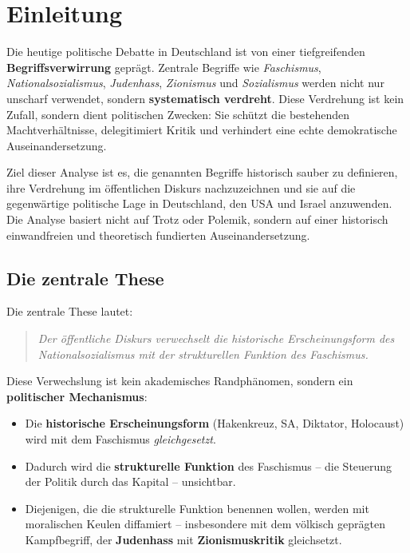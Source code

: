 \section{Einleitung}

Die heutige politische Debatte in Deutschland ist von einer tiefgreifenden \textbf{Begriffsverwirrung} geprägt. Zentrale Begriffe wie \emph{Faschismus}, \emph{Nationalsozialismus}, \emph{Judenhass}, \emph{Zionismus} und \emph{Sozialismus} werden nicht nur unscharf verwendet, sondern \textbf{systematisch verdreht}. Diese Verdrehung ist kein Zufall, sondern dient politischen Zwecken: Sie schützt die bestehenden Machtverhältnisse, delegitimiert Kritik und verhindert eine echte demokratische Auseinandersetzung.

Ziel dieser Analyse ist es, die genannten Begriffe historisch sauber zu definieren, ihre Verdrehung im öffentlichen Diskurs nachzuzeichnen und sie auf die gegenwärtige politische Lage in Deutschland, den USA und Israel anzuwenden. Die Analyse basiert nicht auf Trotz oder Polemik, sondern auf einer historisch einwandfreien und theoretisch fundierten Auseinandersetzung.

\subsection{Die zentrale These}

Die zentrale These lautet:

\begin{quote}
\emph{Der öffentliche Diskurs verwechselt die historische Erscheinungsform des Nationalsozialismus mit der strukturellen Funktion des Faschismus.}
\end{quote}

Diese Verwechslung ist kein akademisches Randphänomen, sondern ein \textbf{politischer Mechanismus}:

\begin{itemize}
    \item Die \textbf{historische Erscheinungsform} (Hakenkreuz, SA, Diktator, Holocaust) wird mit dem Faschismus \emph{gleichgesetzt}.
    \item Dadurch wird die \textbf{strukturelle Funktion} des Faschismus -- die Steuerung der Politik durch das Kapital -- unsichtbar.
    \item Diejenigen, die die strukturelle Funktion benennen wollen, werden mit moralischen Keulen diffamiert -- insbesondere mit dem völkisch geprägten Kampfbegriff, der \textbf{Judenhass} mit \textbf{Zionismuskritik} gleichsetzt.
\end{itemize}

